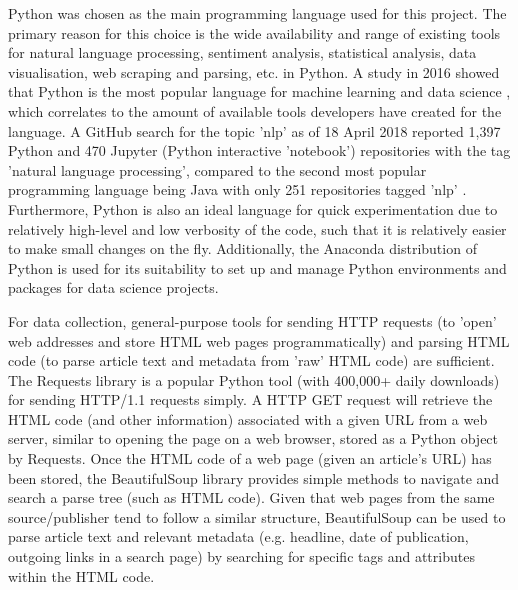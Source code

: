 \documentclass{report}
\begin{document}
Python was chosen as the main programming language used for this project.
The primary reason for this choice is the wide availability and range of existing tools for natural language processing, sentiment analysis, statistical analysis, data visualisation, web scraping and parsing, etc. in Python.
A study in 2016 showed that Python is the most popular language for machine learning and data science \cite{puget2016most}, which correlates to the amount of available tools developers have created for the language.
A GitHub search for the topic 'nlp' as of 18 April 2018 reported 1,397 Python and 470 Jupyter (Python interactive 'notebook') repositories with the tag 'natural language processing', compared to the second most popular programming language being Java with only 251 repositories tagged 'nlp' \cite{GitHubNLP}.
Furthermore, Python is also an ideal language for quick experimentation due to relatively high-level and low verbosity of the code, such that it is relatively easier to make small changes on the fly.
Additionally, the Anaconda distribution of Python \cite{Anaconda} is used for its suitability to set up and manage Python environments and packages for data science projects.

For data collection, general-purpose tools for sending HTTP requests (to 'open' web addresses and store HTML web pages programmatically) and parsing HTML code (to parse article text and metadata from 'raw' HTML code) are sufficient. 
The Requests library \cite{Requests} is a popular Python tool (with 400,000+ daily downloads) for sending HTTP/1.1 requests simply.
A HTTP GET request will retrieve the HTML code (and other information) associated with a given URL from a web server, similar to opening the page on a web browser, stored as a Python object by Requests.
Once the HTML code of a web page (given an article's URL) has been stored, the BeautifulSoup library \cite{BeautifulSoup} provides simple methods to navigate and search a parse tree (such as HTML code).
Given that web pages from the same source/publisher tend to follow a similar structure, BeautifulSoup can be used to parse article text and relevant metadata (e.g. headline, date of publication, outgoing links in a search page) by searching for specific tags and attributes within the HTML code.
\end{document}
